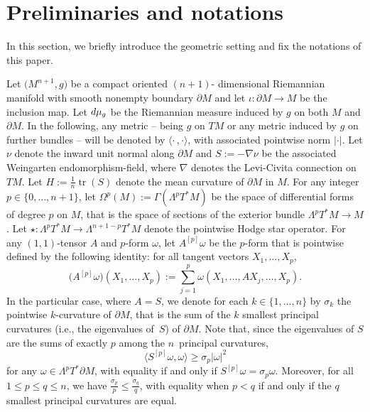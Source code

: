 \documentclass[11pt]{article}
\numberwithin{equation}{section}
\numberwithin{equation}{section}
\begin{document}
\section{Preliminaries and notations}\label{s:prelim}

In this section, we briefly introduce the geometric setting and fix the notations of this paper.

Let $\big(M^{n+1},g\big)$ be a compact oriented $(n+1)$- dimensional Riemannian ma\-ni\-fold with smooth nonempty boundary $\partial M$ and let $\iota\colon\partial M\to M$ be the inclusion map.
Let ${\rm d}\mu_g$ be the Riemannian measure induced by $g$ on both $M$ and $\partial M$.
In the following, any metric -- being $g$ on $TM$ or any metric induced by $g$ on further bundles -- will be denoted by $\langle\cdot\,,\cdot\rangle$, with associated pointwise norm $|\cdot|$.
Let $\nu$ denote the inward unit normal along $\partial M$ and $S:=-\nabla\nu$ be the associated Weingarten endomorphism-field, where $\nabla$ denotes the Levi-Civita connection on $TM$.
Let $H:=\frac{1}{n}\operatorname{tr}(S)$ denote the mean curvature of $\partial M$ in $M$.
For any integer $p\in\{0,\dots,n+1\}$, let $\Omega^p(M):=\Gamma(\Lambda^pT^*M)$ be the space of differential forms of degree $p$ on $M$, that is the space of sections of the exterior bundle $\Lambda^p T^*M\to M$.
Let $\star\colon\Lambda^pT^*M\to\Lambda^{n+1-p}T^*M$ denote the pointwise Hodge star  operator.
For any $(1,1)$-tensor $A$ and $p$-form $\omega$, let $A^{[p]}\omega$ be the $p$-form that is pointwise defined by the following identity: for all tangent vectors $X_1,\dots,X_p$,
\[\bigl(A^{[p]}\omega\bigr)(X_1,\dots,X_p):=\sum_{j=1}^p\omega(X_1,\dots,AX_j,\dots,X_p).\]
In the particular case, where $A=S$, we denote for each $k\in\{1,\dots,n\}$ by $\sigma_k$ the pointwise $k$-curvature of $\partial M$, that is the sum of the $k$ smallest principal curvatures (i.e., the eigenvalues of~$S$) of $\partial M$.
Note that, since the eigenvalues of $S$ are the sums of exactly $p$ among the $n$~principal curvatures,
\[\bigl\langle S^{[p]}\omega,\omega\bigr\rangle\geq\sigma_p|\omega|^2\]
for any $\omega\in\Lambda^pT^*\partial M$, with equality if and only if $S^{[p]}\omega=\sigma_p\omega$.
Moreover, for all $1\leq p\leq q\leq n$, we have $\frac{\sigma_p}{p}\leq\frac{\sigma_q}{q}$, with equality when $p<q$ if and only if the $q$ smallest principal curvatures are equal.
\end{document}
